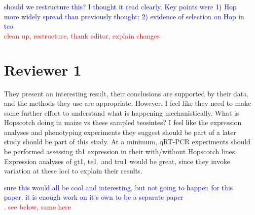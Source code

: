 \documentclass[11pt]{article}
\newcommand{\res}[1]{\noindent \textcolor{blue}{{#1}} \\}
\newcommand{\jri}[1]{\noindent \textcolor{red}{{#1}} \\}
\begin{document}
\res{should we restructure this? I thought it read clearly. Key points were 1) Hop more widely spread than previously thought; 2) evidence of selection on Hop in teo}
\jri{clean up, restructure, thank editor, explain changes}



\section*{Reviewer 1}



They present an interesting result, their conclusions are supported by their data, and the methods they use are appropriate. However, I feel like they need to make some further effort to understand what is happening mechanistically. What is Hopscotch doing in maize vs these sampled teosintes? I feel like the expression analyses and phenotyping experiments they suggest should be part of a later study should be part of this study. At a minimum, qRT-PCR experiments should be performed assessing tb1 expression in their with/without Hopscotch lines. Expression analyses of gt1, te1, and tru1 would be great, since they invoke variation at these loci to explain their results. 

\res{sure this would all be cool and interesting, but not going to happen for this paper. it is enough work on it's own to be a separate paper}. 
\jri{see below, same here}
\end{document}
